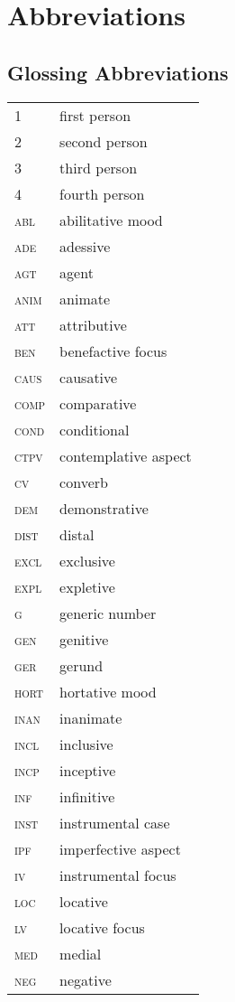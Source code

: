 \chapter*{Abbreviations}
\section*{Glossing Abbreviations}
\begin{longtabu} {>{\scshape}YY[2.5]}
	1		& first person\\
	2		& second person\\
	3		& third person\\
	4		& fourth person\\
	abl		& abilitative mood\\
	ade		& adessive\\
	agt		& agent\\
	anim	& animate\\
	att		& attributive\\
	ben		& benefactive focus\\
	caus	& causative\\
	comp	& comparative\\
	cond	& conditional\\
	ctpv	& contemplative aspect\\
	cv		& converb\\
	dem		& demonstrative\\
	dist	& distal\\
	excl	& exclusive\\
	expl	& expletive\\
	g		& generic number\\
	gen 	& genitive\\
	ger		& gerund\\
	hort	& hortative mood\\
	inan	& inanimate\\
	incl	& inclusive\\
	incp	& inceptive\\
	inf		& infinitive\\
	inst	& instrumental case\\
	ipf		& imperfective aspect\\
	iv		& instrumental focus\\
	loc		& locative\\
	lv		& locative focus\\
	med		& medial\\
	neg		& negative\\

\end{longtabu}
